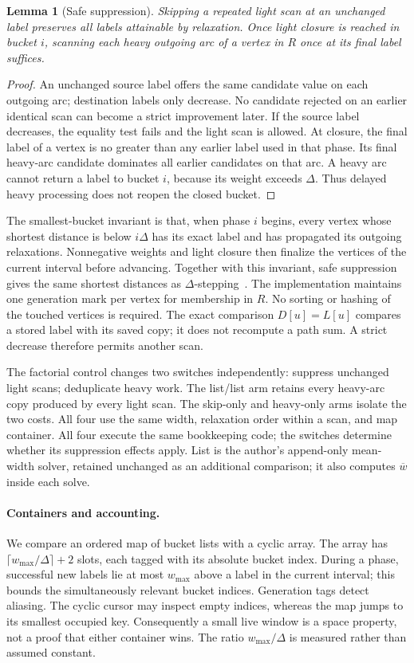 \documentclass[11pt]{article}
\newtheorem{lemma}{Lemma}
\newcommand{\meanw}{\overline{w}}
\begin{document}
\begin{lemma}[Safe suppression]
Skipping a repeated light scan at an unchanged label preserves all labels
attainable by relaxation. Once light closure is reached in bucket $i$, scanning
each heavy outgoing arc of a vertex in $R$ once at its final label suffices.
\end{lemma}
\begin{proof}
An unchanged source label offers the same candidate value on each outgoing arc;
destination labels only decrease. No candidate rejected on an earlier identical
scan can become a strict improvement later. If the source label decreases,
the equality test fails and the light scan is allowed. At closure, the final
label of a vertex is no greater than any earlier label used in that phase.
Its final heavy-arc candidate dominates all earlier candidates on that arc.
A heavy arc cannot return a label to bucket $i$, because its weight exceeds
$\Delta$. Thus delayed heavy processing does not reopen the closed bucket.
\end{proof}
The smallest-bucket invariant is that, when phase $i$ begins, every vertex whose
shortest distance is below $i\Delta$ has its exact label and has propagated its
outgoing relaxations. Nonnegative weights and light closure then finalize the
vertices of the current interval before advancing. Together with this invariant,
safe suppression gives the same
shortest distances as $\Delta$-stepping~\cite{meyer}. The implementation maintains
one generation mark per vertex for membership in $R$. No sorting or hashing of
the touched vertices is required.
The exact comparison $D[u]=L[u]$ compares a stored label with its saved copy;
it does not recompute a path sum. A strict decrease therefore permits another scan.

The factorial control changes two switches independently: suppress unchanged
light scans; deduplicate heavy work. The list/list arm retains every heavy-arc
copy produced by every light scan. The skip-only and heavy-only arms isolate the
two costs. All four use the same width, relaxation order within a scan, and map
container. All four execute the same bookkeeping code; the switches determine
whether its suppression effects apply. List is the author's append-only
mean-width solver, retained unchanged as an additional comparison; it also
computes $\meanw$ inside each solve.

\paragraph{Containers and accounting.}
We compare an ordered map of bucket lists with a cyclic array. The array has
$\lceil w_{\max}/\Delta\rceil+2$ slots, each tagged with its absolute bucket
index. During a phase, successful new labels lie at most $w_{\max}$ above a
label in the current interval; this bounds the simultaneously relevant bucket
indices. Generation tags detect aliasing. The cyclic cursor may inspect empty
indices, whereas the map jumps to its smallest occupied key. Consequently a
small live window is a space property, not a proof that either container wins.
The ratio $w_{\max}/\Delta$ is measured rather than assumed constant.
\end{document}
